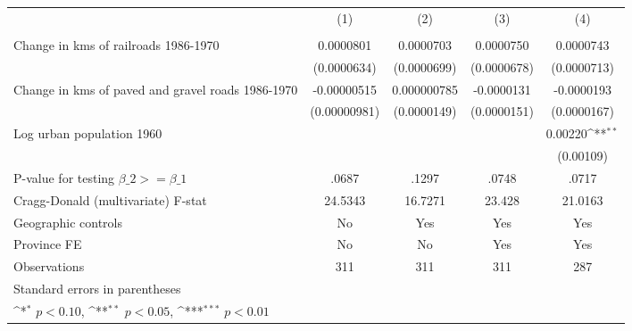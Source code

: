 {
\def\sym#1{\ifmmode^{#1}\else\(^{#1}\)\fi}
\begin{tabular}{l*{4}{c}}
\hline\hline
                &\multicolumn{1}{c}{(1)}&\multicolumn{1}{c}{(2)}&\multicolumn{1}{c}{(3)}&\multicolumn{1}{c}{(4)}\\
                &\multicolumn{1}{c}{}&\multicolumn{1}{c}{}&\multicolumn{1}{c}{}&\multicolumn{1}{c}{}\\
\hline
Change in kms of railroads 1986-1970&0.0000801         &0.0000703         &0.0000750         &0.0000743         \\
                &(0.0000634)         &(0.0000699)         &(0.0000678)         &(0.0000713)         \\
[1em]
Change in kms of paved and gravel roads 1986-1970&-0.00000515         &0.000000785         &-0.0000131         &-0.0000193         \\
                &(0.00000981)         &(0.0000149)         &(0.0000151)         &(0.0000167)         \\
[1em]
Log urban population 1960&                  &                  &                  &  0.00220\sym{**} \\
                &                  &                  &                  &(0.00109)         \\
\hline
P-value for testing $\beta\_{2} >= \beta\_{1}$&    .0687         &    .1297         &    .0748         &    .0717         \\
Cragg-Donald (multivariate) F-stat&  24.5343         &  16.7271         &   23.428         &  21.0163         \\
Geographic controls&       No         &      Yes         &      Yes         &      Yes         \\
Province FE     &       No         &       No         &      Yes         &      Yes         \\
Observations    &      311         &      311         &      311         &      287         \\
\hline\hline
\multicolumn{5}{l}{\footnotesize Standard errors in parentheses}\\
\multicolumn{5}{l}{\footnotesize \sym{*} \(p<0.10\), \sym{**} \(p<0.05\), \sym{***} \(p<0.01\)}\\
\end{tabular}
}
